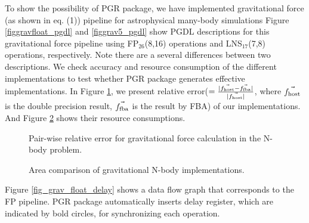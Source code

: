 \documentclass{article}
\begin{document}
To show the possibility of PGR package, we have implemented gravitational
force (as shown in eq. (1)) pipeline for astrophysical many-body simulations
Figure \ref{figgravfloat_pgdl} and \ref{figgrav5_pgdl}
show PGDL descriptions for this gravitational force pipeline
using FP$_{26}$(8,16) operations and LNS$_{17}$(7,8) operations, respectively.
Note there are a several differences between two descriptions.
We check accuracy and resource consumption of the different implementations 
to test whether PGR package generates effective implementations.
In Figure \ref{SrError}, we present relative error($=\frac{|\vec{f_{\rm host}}-\vec{f_{\rm fba}}|}{|\vec{f_{\rm host}}|}$, where $\vec{f_{\rm host}}$ is the double precision result, $\vec{f_{\rm fba}}$ is the result by FBA) of our implementations.
And Figure \ref{AreaComp} shows their resource consumptions.

\begin{figure}[t]
\begin{minipage}[b]{1.0\linewidth}\centering
  \centerline{}
\end{minipage}
\caption{Pair-wise relative error for gravitational force calculation in the N-body problem.}\label{SrError}
\end{figure}

\begin{figure}[t]
\begin{minipage}[b]{1.0\linewidth}\centering
  \centerline{}
\end{minipage}
\caption{Area comparison of gravitational N-body implementations.}\label{AreaComp}
\end{figure}

Figure \ref{fig_grav_float_delay} shows a data flow graph that corresponds to the FP pipeline.
PGR package automatically inserts delay register, which are indicated by bold circles,
for synchronizing each operation.
\end{document}
